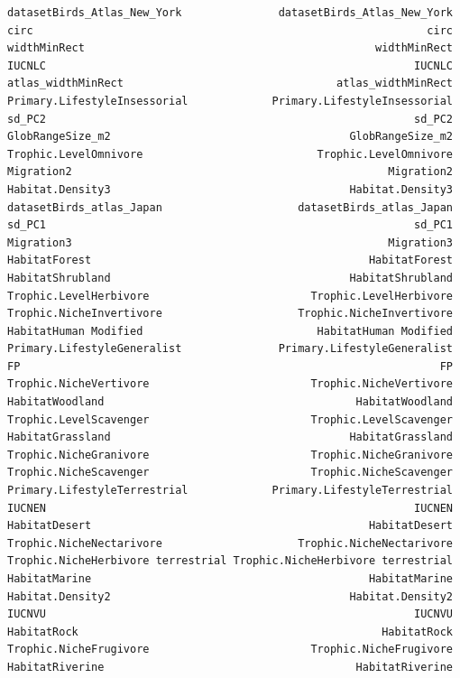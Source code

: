\documentclass[
  letterpaper,
  DIV=11,
  numbers=noendperiod]{scrreprt}
\begin{document}
\begin{verbatim}
datasetBirds_Atlas_New_York               datasetBirds_Atlas_New_York
circ                                                             circ
widthMinRect                                             widthMinRect
IUCNLC                                                         IUCNLC
atlas_widthMinRect                                 atlas_widthMinRect
Primary.LifestyleInsessorial             Primary.LifestyleInsessorial
sd_PC2                                                         sd_PC2
GlobRangeSize_m2                                     GlobRangeSize_m2
Trophic.LevelOmnivore                           Trophic.LevelOmnivore
Migration2                                                 Migration2
Habitat.Density3                                     Habitat.Density3
datasetBirds_atlas_Japan                     datasetBirds_atlas_Japan
sd_PC1                                                         sd_PC1
Migration3                                                 Migration3
HabitatForest                                           HabitatForest
HabitatShrubland                                     HabitatShrubland
Trophic.LevelHerbivore                         Trophic.LevelHerbivore
Trophic.NicheInvertivore                     Trophic.NicheInvertivore
HabitatHuman Modified                           HabitatHuman Modified
Primary.LifestyleGeneralist               Primary.LifestyleGeneralist
FP                                                                 FP
Trophic.NicheVertivore                         Trophic.NicheVertivore
HabitatWoodland                                       HabitatWoodland
Trophic.LevelScavenger                         Trophic.LevelScavenger
HabitatGrassland                                     HabitatGrassland
Trophic.NicheGranivore                         Trophic.NicheGranivore
Trophic.NicheScavenger                         Trophic.NicheScavenger
Primary.LifestyleTerrestrial             Primary.LifestyleTerrestrial
IUCNEN                                                         IUCNEN
HabitatDesert                                           HabitatDesert
Trophic.NicheNectarivore                     Trophic.NicheNectarivore
Trophic.NicheHerbivore terrestrial Trophic.NicheHerbivore terrestrial
HabitatMarine                                           HabitatMarine
Habitat.Density2                                     Habitat.Density2
IUCNVU                                                         IUCNVU
HabitatRock                                               HabitatRock
Trophic.NicheFrugivore                         Trophic.NicheFrugivore
HabitatRiverine                                       HabitatRiverine

\end{verbatim}
\end{document}

